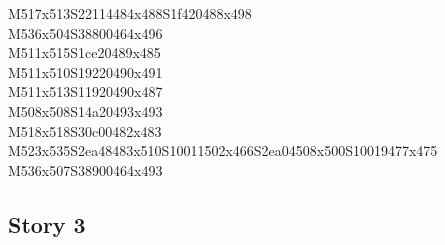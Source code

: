 \documentclass{article}
\begin{document}
\begin{multicols}{5}
\begin{center}
M517x513S22114484x488S1f420488x498 %
\\M536x504S38800464x496 %
\\M511x515S1ce20489x485 %
\\M511x510S19220490x491 %
\\M511x513S11920490x487 %
\\M508x508S14a20493x493 %
\\M518x518S30c00482x483 %
\\M523x535S2ea48483x510S10011502x466S2ea04508x500S10019477x475 %
\\M536x507S38900464x493 %
\vfil

\end{center}
\end{multicols}

\subsection{Story 3}
\end{document}
